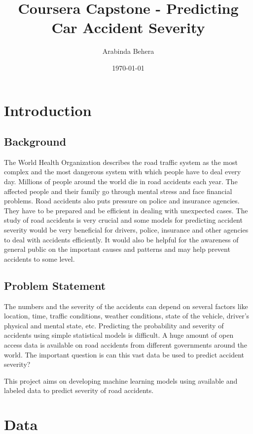 \documentclass[12pt]{article}
\begin{document}
\title{Coursera Capstone - Predicting Car Accident Severity}
\author{Arabinda Behera}
\date{\today}
\maketitle

\section{Introduction}
\subsection{Background}
The World Health Organization describes the road traffic system as the most complex and the most dangerous system with which people have to deal every day. Millions of people around the world die in road accidents each year. The affected people and their family go through mental stress and face financial problems. Road accidents also puts pressure on police and insurance agencies. They have to be prepared and be efficient in dealing with unexpected cases. The study of road accidents is very crucial and some models for predicting accident severity would be very beneficial for drivers, police, insurance and other agencies to deal with accidents efficiently. It would also be helpful for the awareness of general public on the important causes and patterns and may help prevent accidents to some level.
\subsection{Problem Statement}
The numbers and the severity of the accidents can depend on several factors like location, time, traffic conditions, weather conditions, state of the vehicle, driver's physical and mental state, etc. Predicting the probability and severity of accidents using simple statistical models is difficult. A huge amount of open access data is available on road accidents from different governments around the world. The important question is can this vast data be used to predict accident severity? 

This project aims on developing machine learning models using available and labeled data to predict severity of road accidents.


\section{Data}
\end{document}
